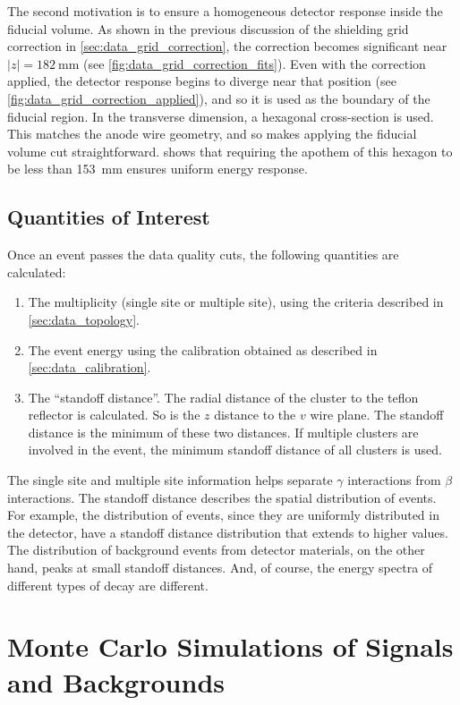 \documentclass[herrin-thesis.tex]{subfiles}
\begin{document}
The second motivation is to ensure a homogeneous detector response inside the fiducial volume. As shown in the previous discussion of the shielding grid correction in \cref{sec:data_grid_correction}, the correction becomes significant near \(|z|=\SI{182}{\mm}\) (see \cref{fig:data_grid_correction_fits}). Even with the correction applied, the detector response begins to diverge near that position (see \cref{fig:data_grid_correction_applied}), and so it is used as the boundary of the fiducial region. In the transverse dimension, a hexagonal cross-section is used. This matches the anode wire geometry, and so makes applying the fiducial volume cut straightforward.  shows that requiring the apothem of this hexagon to be less than \SI{153}{\mm} ensures uniform energy response.

\subsection{Quantities of Interest}
\label{sec:analysis_quantities_of_interest}
Once an event passes the data quality cuts, the following quantities are calculated:
\begin{enumerate}
\item The multiplicity (single site or multiple site), using the criteria described in \cref{sec:data_topology}.
\item The event energy using the calibration obtained as described in \cref{sec:data_calibration}.
\item The ``standoff distance''. The radial distance of the cluster to the teflon reflector is calculated. So is the \(z\) distance to the \(v\) wire plane. The standoff distance is the minimum of these two distances. If multiple clusters are involved in the event, the minimum standoff distance of all clusters is used.
\end{enumerate}

The single site and multiple site information helps separate \(\gamma\) interactions from \(\beta\) interactions. The standoff distance describes the spatial distribution of events. For example, the distribution of \twonu{} events, since they are uniformly distributed in the detector, have a standoff distance distribution that extends to higher values. The distribution of background events from detector materials, on the other hand, peaks at small standoff distances. And, of course, the energy spectra of different types of decay are different.

\section{Monte Carlo Simulations of Signals and Backgrounds}
\label{sec:analysis_monte_carlo}
\end{document}

